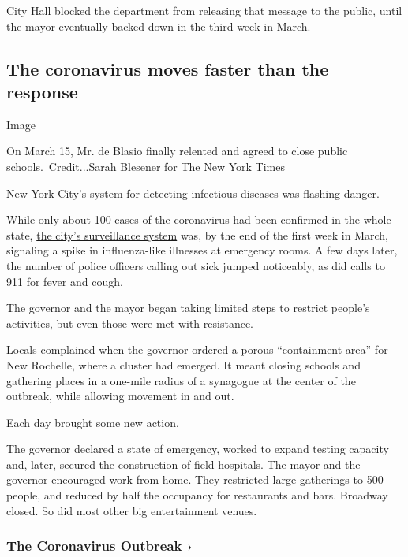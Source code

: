 City Hall blocked the department from releasing that message to the
public, until the mayor eventually backed down in the third week in
March.

\hypertarget{the-coronavirus-moves-faster-than-the-response}{%
\subsection{The coronavirus moves faster than the
response}\label{the-coronavirus-moves-faster-than-the-response}}

Image

On March 15, Mr. de Blasio finally relented and agreed to close public
schools.~Credit...Sarah Blesener for The New York Times

New York City's system for detecting infectious diseases was flashing
danger.

While only about 100 cases of the coronavirus had been confirmed in the
whole state,
\href{https://a816-health.nyc.gov/hdi/epiquery/disease-reporting}{the
city's surveillance system} was, by the end of the first week in March,
signaling a spike in influenza-like illnesses at emergency rooms. A few
days later, the number of police officers calling out sick jumped
noticeably, as did calls to 911 for fever and cough.

The governor and the mayor began taking limited steps to restrict
people's activities, but even those were met with resistance.

Locals complained when the governor ordered a porous ``containment
area'' for New Rochelle, where a cluster had emerged. It meant closing
schools and gathering places in a one-mile radius of a synagogue at the
center of the outbreak, while allowing movement in and out.

Each day brought some new action.

The governor declared a state of emergency, worked to expand testing
capacity and, later, secured the construction of field hospitals. The
mayor and the governor encouraged work-from-home. They restricted large
gatherings to 500 people, and reduced by half the occupancy for
restaurants and bars. Broadway closed. So did most other big
entertainment venues.

\href{https://www.nytimes3xbfgragh.onion/news-event/coronavirus?action=click\&pgtype=Article\&state=default\&region=MAIN_CONTENT_3\&context=storylines_faq}{}

\hypertarget{the-coronavirus-outbreak-}{%
\subsubsection{The Coronavirus Outbreak
›}\label{the-coronavirus-outbreak-}}

